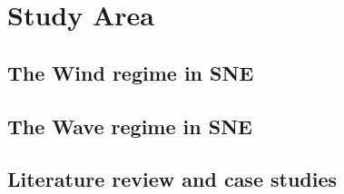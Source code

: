 
\chapter{Study Area} %

\label{Chapter3} %


\section{The Wind regime in SNE}


\section{The Wave regime in SNE}


\section{Literature review and case studies}

